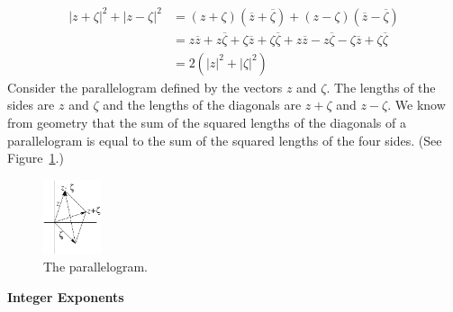 {%
\begin{Solution}
  \label{solution parallelogram identity}
  \begin{align*}
    \left| z + \zeta \right|^2 + \left| z - \zeta \right|^2
    &= \left( z + \zeta \right) \left( \overline{z} + \overline{\zeta} \right)
    + \left( z - \zeta \right) \left( \overline{z} - \overline{\zeta} \right) 
    \\
    &= z \overline{z} + z \overline{\zeta} + \zeta \overline{z} + \zeta \overline{\zeta}
    + z \overline{z} - z \overline{\zeta} - \zeta \overline{z} + \zeta \overline{\zeta} 
    \\
    &= 2 \left( \left| z \right|^2 + \left| \zeta \right|^2 \right)
  \end{align*}
  Consider the parallelogram defined by the vectors $z$ and $\zeta$.  
  The lengths of the sides are $z$ and $\zeta$ and the lengths of the 
  diagonals are $z + \zeta$ and $z - \zeta$.  
  We know from geometry that the sum of the squared lengths of the diagonals
  of a parallelogram is equal to the sum of the squared lengths of the four
  sides.  (See Figure~\ref{para_identity}.)
  \begin{figure}[h!]
    \begin{center}
      \includegraphics[width=0.15\textwidth]{fcv/number/para_identity}
    \end{center}
    \caption{The parallelogram.}
    \label{para_identity}
  \end{figure}
\end{Solution}



\begin{large}
  \noindent
  \textbf{Integer Exponents}
\end{large}



}
